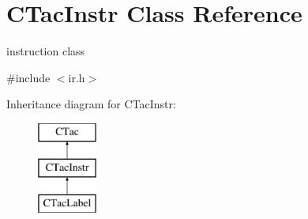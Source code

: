 \hypertarget{classCTacInstr}{\section{C\-Tac\-Instr Class Reference}
\label{classCTacInstr}
}


instruction class  




{\ttfamily \#include $<$ir.\-h$>$}

Inheritance diagram for C\-Tac\-Instr\-:\begin{figure}[H]
\begin{center}
\leavevmode
\includegraphics[height=3.000000cm]{classCTacInstr}
\end{center}
\end{figure}

